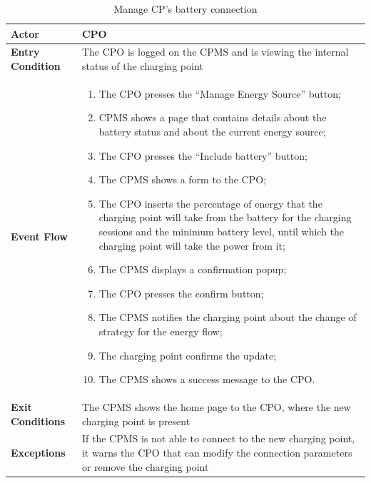 \documentclass{Configuration_Files/PoliMi3i_thesis}
\begin{document}

\begin{table}[H]
    \begin{tabularx}{\textwidth}{| >{\columncolor{bluepoli!40}}l | X |}
    \hline
    \textbf{Actor} & CPO\T\B \\
    \hline
    \textbf{Entry Condition} & The CPO is logged on the CPMS and is viewing the internal status of the charging point\T\B\\
    \hline
    \textbf{Event Flow} & 
        \begin{enumerate}
        \item The CPO presses the “Manage Energy Source” button;
        \item CPMS shows a page that contains details about the battery status and about the current energy source;
        \item The CPO presses the “Include battery” button;
        \item The CPMS shows a form to the CPO;
        \item The CPO inserts the percentage of energy that the charging point will take from the battery for the charging sessions and the minimum battery level, until which the charging point will take the power from it;
        \item The CPMS displays a confirmation popup;
        \item The CPO presses the confirm button;
        \item The CPMS notifies the charging point about the change of strategy for the energy flow;
        \item The charging point confirms the update;
        \item The CPMS shows a success message to the CPO.
        \end{enumerate}\B\\
    \hline
    \textbf{Exit Conditions} & The CPMS shows the home page to the CPO, where the new charging point is present\B\\
    \hline
    \textbf{Exceptions} & If the CPMS is not able to connect to the new charging point, it warns the CPO that can modify the connection parameters or remove the charging point\B\\
    \hline
    \end{tabularx}
    \\[10pt]
    \caption{Manage CP’s battery  connection}
    \label{table:example}
\end{table}
\end{document}
